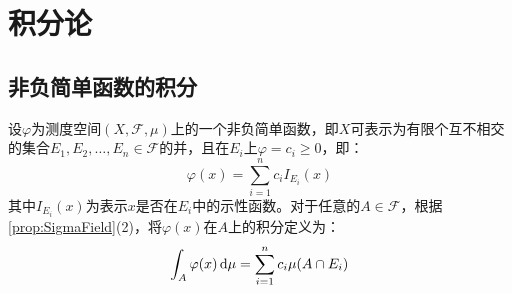 \section{积分论}

\subsection{非负简单函数的积分}
\begin{definition}
	设$\varphi$为测度空间$(X,\mathscr{F},\mu)$上的一个非负简单函数，即$X$可表示为有限个互不相交的集合$E_1,E_2,\dots,E_n\in \mathscr{F}$的并，且在$E_i$上$\varphi=c_i\geqslant0$，即：
	\begin{equation*}
		\varphi(x)=\sum_{i=1}^{n}c_iI_{E_i}(x)
	\end{equation*}
	其中$I_{E_i}(x)$为表示$x$是否在$E_i$中的示性函数。对于任意的$A\in \mathscr{F}$，根据\cref{prop:SigmaField}(2)，将$\varphi(x)$在$A$上的积分定义为：
	\begin{equation*}
		\int_{A}\varphi(x)\mathop{}\!\mathrm{d}\mu=\sum_{i=1}^{n}c_i\mu(A\cap E_i)
	\end{equation*}
\end{definition}
